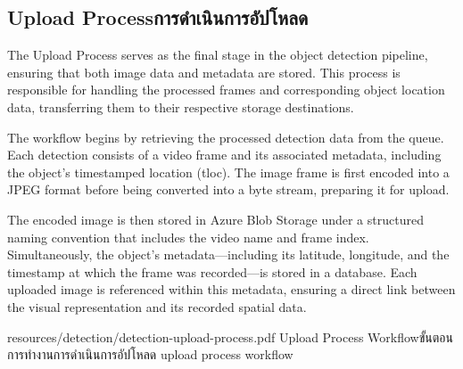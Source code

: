 \subsection{\ifenglish Upload Process\else การดำเนินการอัปโหลด\fi}
The Upload Process serves as the final stage in the object detection pipeline, ensuring that both image data and metadata are stored. This process is responsible for handling the processed frames and corresponding object location data, transferring them to their respective storage destinations.

The workflow begins by retrieving the processed detection data from the queue. Each detection consists of a video frame and its associated metadata, including the object's timestamped location (tloc). The image frame is first encoded into a JPEG format before being converted into a byte stream, preparing it for upload.

The encoded image is then stored in Azure Blob Storage under a structured naming convention that includes the video name and frame index. Simultaneously, the object's metadata—including its latitude, longitude, and the timestamp at which the frame was recorded—is stored in a database. Each uploaded image is referenced within this metadata, ensuring a direct link between the visual representation and its recorded spatial data.

\insertPDFfigure
{resources/detection/detection-upload-process.pdf}
{\ifenglish Upload Process Workflow\else ขั้นตอนการทำงานการดำเนินการอัปโหลด\fi}
{upload process workflow}